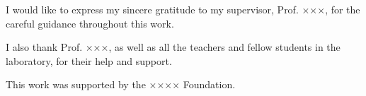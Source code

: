 \begin{acknowledgements}
I would like to express my sincere gratitude to my supervisor, Prof. ×××, for the careful guidance throughout this work.

I also thank Prof. ×××, as well as all the teachers and fellow students in the laboratory, for their help and support.

This work was supported by the ×××× Foundation.
\end{acknowledgements}

